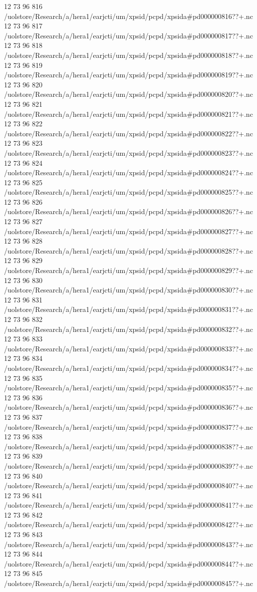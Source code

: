 12 73 96
816
/uolstore/Research/a/hera1/earjcti/um/xpsid/pcpd/xpsida#pd000000816??+.nc
12 73 96
817
/uolstore/Research/a/hera1/earjcti/um/xpsid/pcpd/xpsida#pd000000817??+.nc
12 73 96
818
/uolstore/Research/a/hera1/earjcti/um/xpsid/pcpd/xpsida#pd000000818??+.nc
12 73 96
819
/uolstore/Research/a/hera1/earjcti/um/xpsid/pcpd/xpsida#pd000000819??+.nc
12 73 96
820
/uolstore/Research/a/hera1/earjcti/um/xpsid/pcpd/xpsida#pd000000820??+.nc
12 73 96
821
/uolstore/Research/a/hera1/earjcti/um/xpsid/pcpd/xpsida#pd000000821??+.nc
12 73 96
822
/uolstore/Research/a/hera1/earjcti/um/xpsid/pcpd/xpsida#pd000000822??+.nc
12 73 96
823
/uolstore/Research/a/hera1/earjcti/um/xpsid/pcpd/xpsida#pd000000823??+.nc
12 73 96
824
/uolstore/Research/a/hera1/earjcti/um/xpsid/pcpd/xpsida#pd000000824??+.nc
12 73 96
825
/uolstore/Research/a/hera1/earjcti/um/xpsid/pcpd/xpsida#pd000000825??+.nc
12 73 96
826
/uolstore/Research/a/hera1/earjcti/um/xpsid/pcpd/xpsida#pd000000826??+.nc
12 73 96
827
/uolstore/Research/a/hera1/earjcti/um/xpsid/pcpd/xpsida#pd000000827??+.nc
12 73 96
828
/uolstore/Research/a/hera1/earjcti/um/xpsid/pcpd/xpsida#pd000000828??+.nc
12 73 96
829
/uolstore/Research/a/hera1/earjcti/um/xpsid/pcpd/xpsida#pd000000829??+.nc
12 73 96
830
/uolstore/Research/a/hera1/earjcti/um/xpsid/pcpd/xpsida#pd000000830??+.nc
12 73 96
831
/uolstore/Research/a/hera1/earjcti/um/xpsid/pcpd/xpsida#pd000000831??+.nc
12 73 96
832
/uolstore/Research/a/hera1/earjcti/um/xpsid/pcpd/xpsida#pd000000832??+.nc
12 73 96
833
/uolstore/Research/a/hera1/earjcti/um/xpsid/pcpd/xpsida#pd000000833??+.nc
12 73 96
834
/uolstore/Research/a/hera1/earjcti/um/xpsid/pcpd/xpsida#pd000000834??+.nc
12 73 96
835
/uolstore/Research/a/hera1/earjcti/um/xpsid/pcpd/xpsida#pd000000835??+.nc
12 73 96
836
/uolstore/Research/a/hera1/earjcti/um/xpsid/pcpd/xpsida#pd000000836??+.nc
12 73 96
837
/uolstore/Research/a/hera1/earjcti/um/xpsid/pcpd/xpsida#pd000000837??+.nc
12 73 96
838
/uolstore/Research/a/hera1/earjcti/um/xpsid/pcpd/xpsida#pd000000838??+.nc
12 73 96
839
/uolstore/Research/a/hera1/earjcti/um/xpsid/pcpd/xpsida#pd000000839??+.nc
12 73 96
840
/uolstore/Research/a/hera1/earjcti/um/xpsid/pcpd/xpsida#pd000000840??+.nc
12 73 96
841
/uolstore/Research/a/hera1/earjcti/um/xpsid/pcpd/xpsida#pd000000841??+.nc
12 73 96
842
/uolstore/Research/a/hera1/earjcti/um/xpsid/pcpd/xpsida#pd000000842??+.nc
12 73 96
843
/uolstore/Research/a/hera1/earjcti/um/xpsid/pcpd/xpsida#pd000000843??+.nc
12 73 96
844
/uolstore/Research/a/hera1/earjcti/um/xpsid/pcpd/xpsida#pd000000844??+.nc
12 73 96
845
/uolstore/Research/a/hera1/earjcti/um/xpsid/pcpd/xpsida#pd000000845??+.nc
